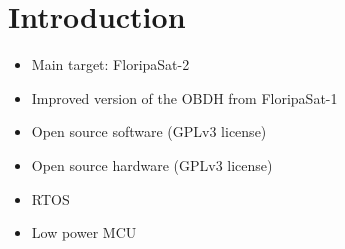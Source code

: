 %
%
%
%
%

%
%
%
%
%
%

\chapter{Introduction} \label{ch:introduction}

\begin{itemize}
    \item Main target: FloripaSat-2
    \item Improved version of the OBDH from FloripaSat-1
    \item Open source software (GPLv3 license)
    \item Open source hardware (GPLv3 license)
    \item RTOS
    \item Low power MCU
\end{itemize}
